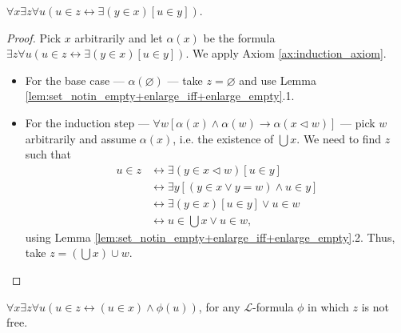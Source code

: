 \begin{theorem}
    \label{thm:exists_unionOfSet}
    \leanok
    $\forall x \exists z \forall u (u \in z \leftrightarrow \exists (y\in x)[u \in y])$.
\end{theorem}

\begin{proof}
    \leanok
    Pick $x$ arbitrarily and let $\alpha (x)$ be the formula $\exists z \forall u (u \in z \leftrightarrow \exists (y\in x)[u \in y])$.
    We apply Axiom \ref{ax:induction_axiom}.
    \begin{itemize}
        \item For the base case — $\alpha (\varnothing)$ — take $z=\varnothing$ and use Lemma \ref{lem:set_notin_empty+enlarge_iff+enlarge_empty}.1.
        \item For the induction step — $\forall w[\alpha(x) \land \alpha(w) \rightarrow \alpha(x \lhd w)]$ — 
        pick $w$ arbitrarily and assume $\alpha(x)$, i.e. the existence of $\bigcup x$.
        We need to find $z$ such that
        \begin{equation*}
        \begin{split}
            u \in z & \leftrightarrow \exists (y \in x \lhd w)[u \in y]\\
            & \leftrightarrow \exists y[(y \in x \lor y = w) \land u \in y]\\
            & \leftrightarrow \exists(y \in x)[u \in y] \lor u \in w\\
            & \leftrightarrow u \in \bigcup x \lor u \in w,
        \end{split}
        \end{equation*}
        using Lemma \ref{lem:set_notin_empty+enlarge_iff+enlarge_empty}.2. Thus, take $z = (\bigcup x) \cup w$.
    \end{itemize}
\end{proof}

\begin{theorem}
    \label{thm:comp_scheme}
    \leanok
    $\forall x \exists z \forall u (u\in z \leftrightarrow (u \in x) \land \phi (u))$, for any $\mathcal{L}$-formula $\phi$ in which $z$ is not free.
\end{theorem}

